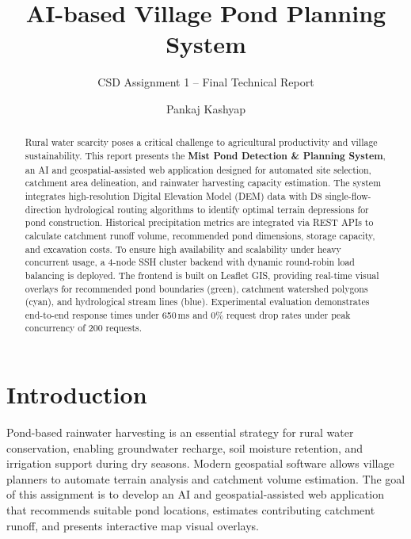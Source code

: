\documentclass[manuscript,screen,review]{acmart}
\begin{document}
\title{AI-based Village Pond Planning System}
\subtitle{CSD Assignment 1 -- Final Technical Report}

\author{Pankaj Kashyap}


\renewcommand{\shortauthors}{Kashyap et al.}

\begin{abstract}
Rural water scarcity poses a critical challenge to agricultural productivity and village sustainability. This report presents the \textbf{Mist Pond Detection \& Planning System}, an AI and geospatial-assisted web application designed for automated site selection, catchment area delineation, and rainwater harvesting capacity estimation. The system integrates high-resolution Digital Elevation Model (DEM) data with D8 single-flow-direction hydrological routing algorithms to identify optimal terrain depressions for pond construction. Historical precipitation metrics are integrated via REST APIs to calculate catchment runoff volume, recommended pond dimensions, storage capacity, and excavation costs. To ensure high availability and scalability under heavy concurrent usage, a 4-node SSH cluster backend with dynamic round-robin load balancing is deployed. The frontend is built on Leaflet GIS, providing real-time visual overlays for recommended pond boundaries (green), catchment watershed polygons (cyan), and hydrological stream lines (blue). Experimental evaluation demonstrates end-to-end response times under 650\,ms and 0\% request drop rates under peak concurrency of 200 requests.
\end{abstract}


\maketitle

\section{Introduction}
\label{sec:intro}
Pond-based rainwater harvesting is an essential strategy for rural water conservation, enabling groundwater recharge, soil moisture retention, and irrigation support during dry seasons. Modern geospatial software allows village planners to automate terrain analysis and catchment volume estimation. The goal of this assignment is to develop an AI and geospatial-assisted web application that recommends suitable pond locations, estimates contributing catchment runoff, and presents interactive map visual overlays.
\end{document}
